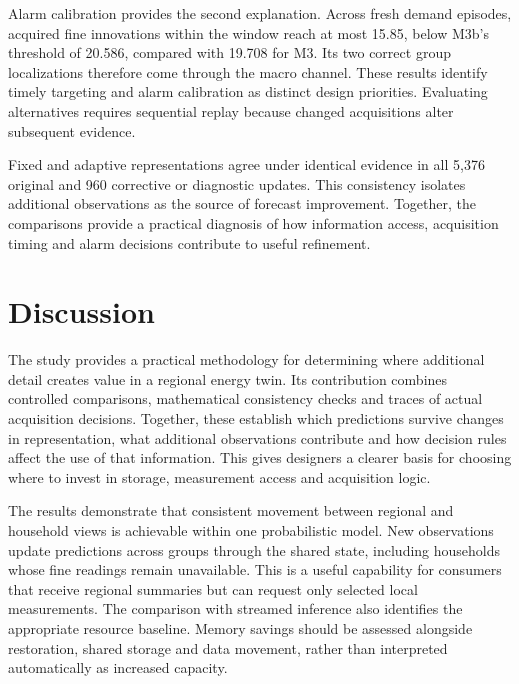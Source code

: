 \documentclass[conference]{IEEEtran}
\begin{document}
Alarm calibration provides the second explanation. Across fresh demand episodes, acquired fine innovations within the window reach at most 15.85, below M3b's threshold of 20.586, compared with 19.708 for M3. Its two correct group localizations therefore come through the macro channel. These results identify timely targeting and alarm calibration as distinct design priorities. Evaluating alternatives requires sequential replay because changed acquisitions alter subsequent evidence.

Fixed and adaptive representations agree under identical evidence in all 5,376 original and 960 corrective or diagnostic updates. This consistency isolates additional observations as the source of forecast improvement. Together, the comparisons provide a practical diagnosis of how information access, acquisition timing and alarm decisions contribute to useful refinement.














\section{Discussion}
The study provides a practical methodology for determining where additional detail creates value in a regional energy twin. Its contribution combines controlled comparisons, mathematical consistency checks and traces of actual acquisition decisions. Together, these establish which predictions survive changes in representation, what additional observations contribute and how decision rules affect the use of that information. This gives designers a clearer basis for choosing where to invest in storage, measurement access and acquisition logic.

The results demonstrate that consistent movement between regional and household views is achievable within one probabilistic model. New observations update predictions across groups through the shared state, including households whose fine readings remain unavailable. This is a useful capability for consumers that receive regional summaries but can request only selected local measurements. The comparison with streamed inference also identifies the appropriate resource baseline. Memory savings should be assessed alongside restoration, shared storage and data movement, rather than interpreted automatically as increased capacity.
\end{document}
